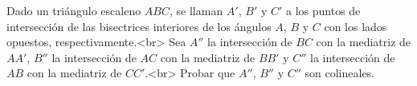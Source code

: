Dado un triángulo escaleno $ABC$, se llaman $A'$, $B'$ y $C'$ a los puntos de intersección de las bisectrices interiores de los ángulos $A$, $B$ y $C$ con los lados opuestos, respectivamente.<br>
Sea $A''$ la intersección de $BC$ con la mediatriz de $AA'$, $B''$ la intersección de $AC$ con la mediatriz de $BB'$ y $C''$ la intersección de $AB$ con la mediatriz de $CC'$.<br>
Probar que $A''$, $B''$ y $C''$ son colineales.
